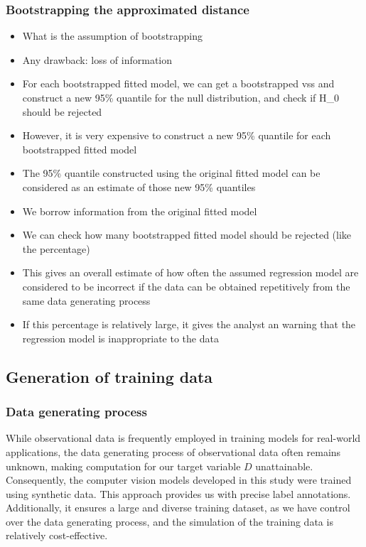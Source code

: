 \documentclass[]{interact}
\theoremstyle{plain}%
\theoremstyle{definition}
\theoremstyle{remark}
\providecommand{\tightlist}{%
  \setlength{\itemsep}{0pt}\setlength{\parskip}{0pt}}
\def\tightlist{}
\begin{document}
\hypertarget{bootstrapping-the-approximated-distance}{%
\subsubsection{Bootstrapping the approximated
distance}\label{bootstrapping-the-approximated-distance}}

\begin{itemize}
\tightlist
\item
  What is the assumption of bootstrapping
\item
  Any drawback: loss of information
\item
  For each bootstrapped fitted model, we can get a bootstrapped vss and
  construct a new 95\% quantile for the null distribution, and check if
  H\_0 should be rejected
\item
  However, it is very expensive to construct a new 95\% quantile for
  each bootstrapped fitted model
\item
  The 95\% quantile constructed using the original fitted model can be
  considered as an estimate of those new 95\% quantiles
\item
  We borrow information from the original fitted model
\item
  We can check how many bootstrapped fitted model should be rejected
  (like the percentage)
\item
  This gives an overall estimate of how often the assumed regression
  model are considered to be incorrect if the data can be obtained
  repetitively from the same data generating process
\item
  If this percentage is relatively large, it gives the analyst an
  warning that the regression model is inappropriate to the data
\end{itemize}

\hypertarget{generation-of-training-data}{%
\subsection{Generation of training
data}\label{generation-of-training-data}}

\hypertarget{data-generating-process}{%
\subsubsection{Data generating process}\label{data-generating-process}}

While observational data is frequently employed in training models for
real-world applications, the data generating process of observational
data often remains unknown, making computation for our target variable
\(D\) unattainable. Consequently, the computer vision models developed
in this study were trained using synthetic data. This approach provides
us with precise label annotations. Additionally, it ensures a large and
diverse training dataset, as we have control over the data generating
process, and the simulation of the training data is relatively
cost-effective.
\end{document}

